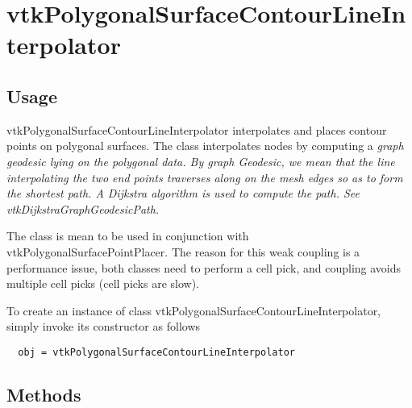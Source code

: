 \section{vtkPolygonalSurfaceContourLineInterpolator}

\subsection{Usage}

 vtkPolygonalSurfaceContourLineInterpolator interpolates and places
 contour points on polygonal surfaces. The class interpolates nodes by
 computing a \em graph \em geodesic lying on the polygonal data. By \em 
 graph \em Geodesic, we mean that the line interpolating the two end
 points traverses along on the mesh edges so as to form the shortest
 path. A Dijkstra algorithm is used to compute the path. See
 vtkDijkstraGraphGeodesicPath.
 
 The class is mean to be used in conjunction with 
 vtkPolygonalSurfacePointPlacer. The reason for this weak coupling is a 
 performance issue, both classes need to perform a cell pick, and 
 coupling avoids multiple cell picks (cell picks are slow).
 

To create an instance of class vtkPolygonalSurfaceContourLineInterpolator, simply
invoke its constructor as follows
\begin{verbatim}
  obj = vtkPolygonalSurfaceContourLineInterpolator
\end{verbatim}
\subsection{Methods}

